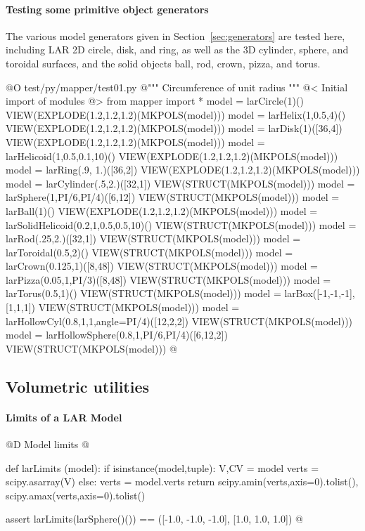 \documentclass[11pt,oneside]{article}	%
\begin{document}
\paragraph{Testing some primitive object generators}
The various model generators given in Section~\ref{sec:generators} are tested here, including LAR 2D circle, disk, and ring, as well as the 3D cylinder, sphere, and toroidal surfaces, and the solid objects ball, rod, crown, pizza, and torus.

@O test/py/mapper/test01.py
@{""" Circumference of unit radius """
@< Initial import of modules @>
from mapper import *
model = larCircle(1)()
VIEW(EXPLODE(1.2,1.2,1.2)(MKPOLS(model)))
model = larHelix(1,0.5,4)()
VIEW(EXPLODE(1.2,1.2,1.2)(MKPOLS(model)))
model = larDisk(1)([36,4])
VIEW(EXPLODE(1.2,1.2,1.2)(MKPOLS(model)))
model = larHelicoid(1,0.5,0.1,10)()
VIEW(EXPLODE(1.2,1.2,1.2)(MKPOLS(model)))
model = larRing(.9, 1.)([36,2])
VIEW(EXPLODE(1.2,1.2,1.2)(MKPOLS(model)))
model = larCylinder(.5,2.)([32,1])
VIEW(STRUCT(MKPOLS(model)))
model = larSphere(1,PI/6,PI/4)([6,12])
VIEW(STRUCT(MKPOLS(model)))
model = larBall(1)()
VIEW(EXPLODE(1.2,1.2,1.2)(MKPOLS(model)))
model = larSolidHelicoid(0.2,1,0.5,0.5,10)()
VIEW(STRUCT(MKPOLS(model)))
model = larRod(.25,2.)([32,1])
VIEW(STRUCT(MKPOLS(model)))
model = larToroidal(0.5,2)()
VIEW(STRUCT(MKPOLS(model)))
model = larCrown(0.125,1)([8,48])
VIEW(STRUCT(MKPOLS(model)))
model = larPizza(0.05,1,PI/3)([8,48])
VIEW(STRUCT(MKPOLS(model)))
model = larTorus(0.5,1)()
VIEW(STRUCT(MKPOLS(model)))
model = larBox([-1,-1,-1],[1,1,1])
VIEW(STRUCT(MKPOLS(model)))
model = larHollowCyl(0.8,1,1,angle=PI/4)([12,2,2])
VIEW(STRUCT(MKPOLS(model)))
model = larHollowSphere(0.8,1,PI/6,PI/4)([6,12,2])
VIEW(STRUCT(MKPOLS(model)))
@}


\subsection{Volumetric utilities}


\paragraph{Limits of a LAR Model}
@D Model limits
@{def larLimits (model):
	if isinstance(model,tuple): 
		V,CV = model
		verts = scipy.asarray(V)
	else: verts = model.verts
	return scipy.amin(verts,axis=0).tolist(), scipy.amax(verts,axis=0).tolist()
	
assert larLimits(larSphere()()) == ([-1.0, -1.0, -1.0], [1.0, 1.0, 1.0])
@}
\end{document}
